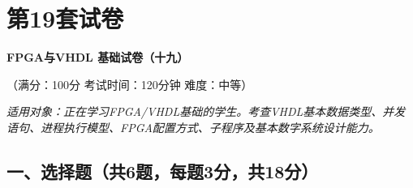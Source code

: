 \chapter{第19套试卷}

\begin{center}
\textbf{FPGA与VHDL 基础试卷（十九）}

（满分：100分 \hspace{2em} 考试时间：120分钟 \hspace{2em} 难度：中等）

\vspace{0.3cm}
\textit{适用对象：正在学习FPGA/VHDL基础的学生。考查VHDL基本数据类型、并发语句、进程执行模型、FPGA配置方式、子程序及基本数字系统设计能力。}
\end{center}

\section*{一、选择题（共6题，每题3分，共18分）}

